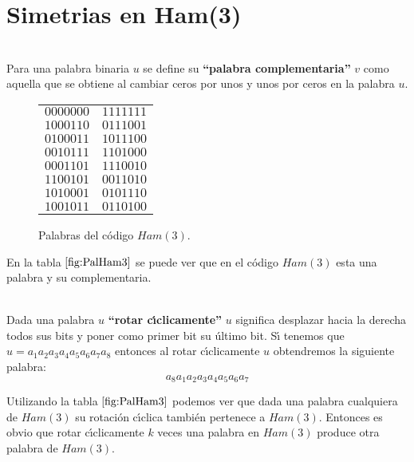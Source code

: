 %
%

\section{Simetrias en Ham(3)}

\begin{definicion}
\ \\
Para una palabra binaria $u$ se define su \textbf{``palabra complementaria''}
$v$ como aquella que se obtiene al cambiar ceros por unos y unos por ceros en la
palabra $u$.
\end{definicion}

\begin{figure}[!h]
\begin{center}
\begin{tabular}{cc}
$0000000$&$1111111$\\
$1000110$&$0111001$\\
$0100011$&$1011100$\\
$0010111$&$1101000$\\
$0001101$&$1110010$\\
$1100101$&$0011010$\\
$1010001$&$0101110$\\
$1001011$&$0110100$\\
\end{tabular}
\end{center}
\caption{Palabras del c\'odigo $Ham(3)$.}\label{fig:PalHam3}
\end{figure}
En la tabla $\ref{fig:PalHam3}$ se puede ver que en el c\'odigo $Ham(3)$ esta
una palabra y su complementaria.

\begin{definicion}
\ \\
Dada una palabra $u$ \textbf{``rotar c\'{\i}clicamente''} $u$ significa
desplazar hacia la derecha todos sus bits y poner como primer bit su \'ultimo
bit. S\'{\i} tenemos que $u=a_1a_2a_3a_4a_5a_6a_7a_8$ entonces al rotar
c\'{\i}clicamente $u$ obtendremos la siguiente palabra:
\begin{displaymath}
a_8a_1a_2a_3a_4a_5a_6a_7
\end{displaymath}
\end{definicion}

Utilizando la tabla $\ref{fig:PalHam3}$ podemos ver que dada una palabra 
cualquiera de $Ham(3)$ su rotaci\'on c\'{\i}clica tambi\'en pertenece a
$Ham(3)$. Entonces es obvio que rotar c\'{\i}clicamente $k$ veces una palabra
en $Ham(3)$ produce otra palabra de $Ham(3)$.

